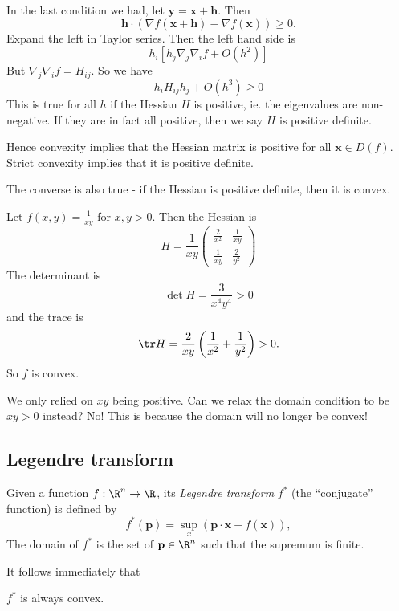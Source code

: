 \documentclass[a4paper]{article}
\begin{document}
In the last condition we had, let $\mathbf{y} = \mathbf{x} + \mathbf{h}$. Then
\[
  \mathbf{h} \cdot (\nabla f(\mathbf{x} + \mathbf{h}) - \nabla f(\mathbf{x})) \geq 0.
\]
Expand the left in Taylor series. Then the left hand side is
\[
  h_i [h_j \nabla_j \nabla_i f + O(h^2)]
\]
But $\nabla_j \nabla_i f = H_{ij}$. So we have
\[
  h_i H_{ij}h_j + O(h^3) \geq 0
\]
This is true for all $h$ if the Hessian $H$ is positive, ie. the eigenvalues are non-negative. If they are in fact all positive, then we say $H$ is positive definite.

Hence convexity implies that the Hessian matrix is positive for all $\mathbf{x}\in D(f)$. Strict convexity implies that it is positive definite.

The converse is also true - if the Hessian is positive definite, then it is convex.

\begin{eg}
  Let $f(x, y) = \frac{1}{xy}$ for $x, y > 0$. Then the Hessian is
  \[
    H = \frac{1}{xy}
    \begin{pmatrix}
      \frac{2}{x^2} & \frac{1}{xy}\\
      \frac{1}{xy} & \frac{2}{y^2}
    \end{pmatrix}
  \]
  The determinant is
  \[
    \det H = \frac{3}{x^4y^4} > 0
  \]
  and the trace is
  \[
    \tr H = \frac{2}{xy}\left(\frac{1}{x^2} + \frac{1}{y^2}\right) > 0.
  \]
  So $f$ is convex.

  We only relied on $xy$ being positive. Can we relax the domain condition to be $xy > 0$ instead? No! This is because the domain will no longer be convex! 
\end{eg}

\subsection{Legendre transform}
\begin{defi}
  Given a function $f: \R^n \to \R$, its \emph{Legendre transform} $f^*$ (the ``conjugate'' function) is defined by
  \[
    f^*(\mathbf{p}) = \sup_{x}(\mathbf{p}\cdot \mathbf{x} - f(\mathbf{x})),
  \]
  The domain of $f^*$ is the set of $\mathbf{p}\in \R^n$ such that the supremum is finite.
\end{defi}
It follows immediately that
\begin{lemma}
  $f^*$ is always convex.
\end{lemma}
\end{document}
